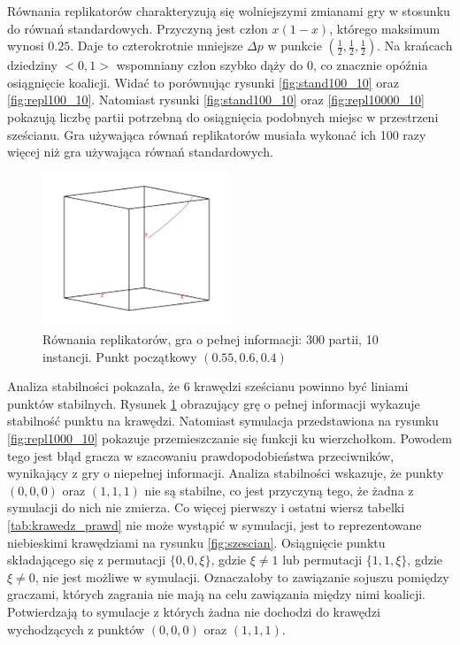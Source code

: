 Równania replikatorów charakteryzują się wolniejszymi zmianami gry w stosunku do równań standardowych. Przyczyną jest człon $x(1-x)$, którego maksimum wynosi $0.25$. Daje to czterokrotnie mniejsze $\Delta p$ w punkcie $(\frac{1}{2}, \frac{1}{2}, \frac{1}{2})$. Na krańcach dziedziny $<0,1>$ wspomniany człon szybko dąży do 0, co znacznie opóźnia osiągnięcie koalicji. Widać to porównując rysunki \ref{fig:stand100_10} oraz \ref{fig:repl100_10}. Natomiast rysunki \ref{fig:stand100_10} oraz \ref{fig:repl10000_10} pokazują liczbę partii potrzebną do osiągnięcia podobnych miejsc w przestrzeni sześcianu. Gra używająca równań replikatorów musiała wykonać ich 100 razy więcej niż gra używająca równań standardowych.
\begin{figure}
    \centering
    \includegraphics[width=0.5\textwidth]{pict/wyniki/repl_realp_mp_300_10.png}   
    \caption{Równania replikatorów, gra o pełnej informacji: 300 partii, 10 instancji. Punkt początkowy $(0.55,0.6,0.4)$}
	\label{fig:realp} 
\end{figure}
Analiza stabilności pokazała, że 6 krawędzi sześcianu powinno być liniami punktów stabilnych. Rysunek \ref{fig:realp} obrazujący grę o pełnej informacji wykazuje stabilność punktu na krawędzi. Natomiast symulacja przedstawiona na rysunku \ref{fig:repl1000_10} pokazuje przemieszczanie się funkcji ku wierzchołkom. Powodem tego jest błąd gracza w szacowaniu prawdopodobieństwa przeciwników, wynikający z gry o niepełnej informacji. Analiza stabilności wskazuje, że punkty $(0,0,0)$ oraz $(1,1,1)$ nie są stabilne, co jest przyczyną tego, że żadna z symulacji do nich nie zmierza. Co więcej pierwszy i ostatni wiersz tabelki \ref{tab:krawedz_prawd} nie może wystąpić w symulacji, jest to reprezentowane niebieskimi krawędziami na rysunku \ref{fig:szescian}. Osiągnięcie punktu składającego się z permutacji $\{0,0,\xi \}$, gdzie $\xi \neq 1$ lub permutacji $\{1,1,\xi \}$, gdzie $\xi \neq 0$, nie jest możliwe w symulacji. Oznaczałoby to zawiązanie sojuszu pomiędzy graczami, których zagrania nie mają na celu zawiązania między nimi koalicji. Potwierdzają to symulacje z których żadna nie dochodzi do krawędzi wychodzących z punktów $(0,0,0)$ oraz $(1,1,1)$.

